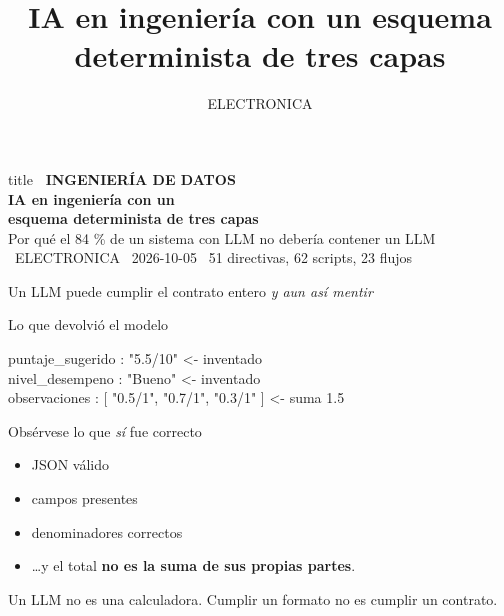 \documentclass[aspectratio=169,11pt]{beamer}
\title{IA en ingeniería con un esquema determinista de tres capas}
\author{ELECTRONICA}
\date{}
\begin{document}
\begin{frame}[plain]
  \begin{beamercolorbox}[sep=16pt,center]{title}
    {\footnotesize\bfseries\color{cyanNeon}\ INGENIERÍA DE DATOS}\\[12pt]
    {\LARGE\bfseries\color{fondoOscuro} IA en ingeniería con un\\ esquema determinista de tres capas}\\[12pt]
    {\large\color{azulMedio} Por qué el 84 \% de un sistema con LLM no debería contener un LLM}\\[20pt]
    {\footnotesize\color{grisTexto}~ELECTRONICA \qquad
      ~2026-10-05\qquad
      ~51 directivas, 62 scripts, 23 flujos}
  \end{beamercolorbox}
\end{frame}

\begin{frame}{Un LLM puede cumplir el contrato entero \emph{y aun así mentir}}
  \begin{alertblock}{Lo que devolvió el modelo}
    \begin{panelMono}
puntaje\_sugerido : "5.5/10"       \textcolor{codigoCadena}{<- inventado}\\
nivel\_desempeno  : "Bueno"        \textcolor{codigoCadena}{<- inventado}\\
observaciones    : [ "0.5/1", "0.7/1", "0.3/1" ]   \textcolor{codigoNumero}{<- suma 1.5}
    \end{panelMono}
  \end{alertblock}
  \smallskip
  \begin{block}{Obsérvese lo que \emph{sí} fue correcto}
    \begin{itemize}
      \item JSON válido \quad \item campos presentes \quad \item denominadores correctos
      \item \ldots y el total \textbf{no es la suma de sus propias partes}.
    \end{itemize}
  \end{block}
  \begin{panelRegla}
    Un LLM no es una calculadora. Cumplir un formato no es cumplir un contrato.
  \end{panelRegla}
\end{frame}
\end{document}
